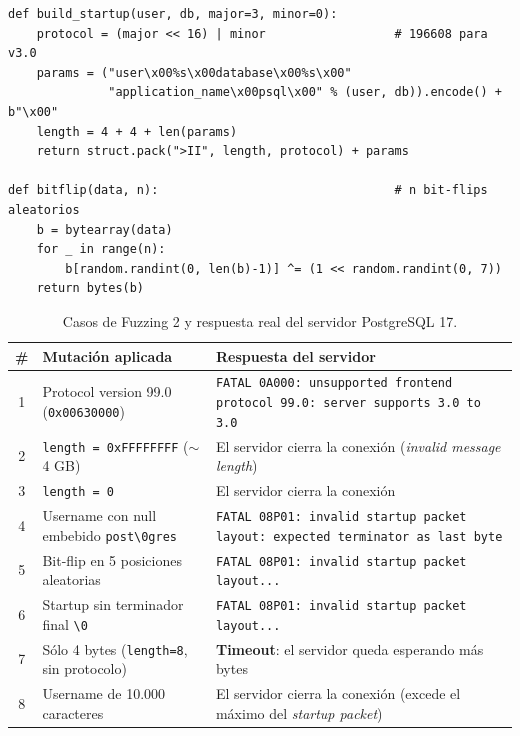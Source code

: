 \documentclass[11pt]{article}
\begin{document}
\begin{lstlisting}[style=python, caption={Constructor del mensaje semilla y bit-flip (\texttt{fuzzing\_2.py}).}]
def build_startup(user, db, major=3, minor=0):
    protocol = (major << 16) | minor                  # 196608 para v3.0
    params = ("user\x00%s\x00database\x00%s\x00"
              "application_name\x00psql\x00" % (user, db)).encode() + b"\x00"
    length = 4 + 4 + len(params)
    return struct.pack(">II", length, protocol) + params

def bitflip(data, n):                                 # n bit-flips aleatorios
    b = bytearray(data)
    for _ in range(n):
        b[random.randint(0, len(b)-1)] ^= (1 << random.randint(0, 7))
    return bytes(b)
\end{lstlisting}

\begin{table}[H]
\centering
\caption{Casos de Fuzzing 2 y respuesta real del servidor PostgreSQL 17.}
\label{tab:fuzz2}
\begin{tabular}{cp{6.4cm}p{6.0cm}}
\toprule
\textbf{\#} & \textbf{Mutación aplicada} & \textbf{Respuesta del servidor} \\
\midrule
1 & Protocol version 99.0 (\texttt{0x00630000}) & \texttt{FATAL 0A000: unsupported frontend protocol 99.0: server supports 3.0 to 3.0} \\
2 & \texttt{length = 0xFFFFFFFF} (\(\sim\)4 GB)  & El servidor cierra la conexión (\emph{invalid message length}) \\
3 & \texttt{length = 0}                          & El servidor cierra la conexión \\
4 & Username con null embebido \texttt{post\textbackslash0gres} & \texttt{FATAL 08P01: invalid startup packet layout: expected terminator as last byte} \\
5 & Bit-flip en 5 posiciones aleatorias          & \texttt{FATAL 08P01: invalid startup packet layout...} \\
6 & Startup sin terminador final \texttt{\textbackslash0} & \texttt{FATAL 08P01: invalid startup packet layout...} \\
7 & Sólo 4 bytes (\texttt{length=8}, sin protocolo) & \textbf{Timeout}: el servidor queda esperando más bytes \\
8 & Username de 10.000 caracteres                & El servidor cierra la conexión (excede el máximo del \emph{startup packet}) \\
\bottomrule
\end{tabular}
\end{table}
\end{document}

